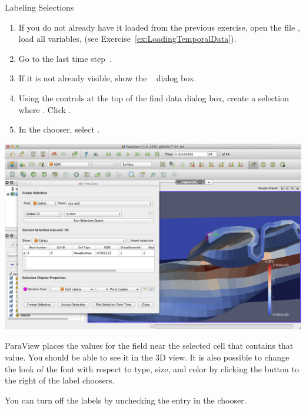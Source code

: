 \begin{exercise}{Labeling Selections}
  \label{ex:LabelingSelections}%
  \begin{enumerate}
  \item If you do not already have it loaded from the previous exercise,
    open the file , load all variables, \apply (see
    Exercise~\ref{ex:LoadingTemporalData}).
  \item Go to the last time step~\vcrLast.
  \item If it is not already visible, show the ~\findData
    dialog box.
  \item Using the controls at the top of the find data dialog box, create a
    selection where  . Click .
  \item In the  chooser, select .
  \end{enumerate}

  \begin{inlinefig}
    \includegraphics[width=\scw]{images/SelectionLabels}
  \end{inlinefig}

  ParaView places the values for the  field near the selected
  cell that contains that value. You should be able to see it in the 3D
  view. It is also possible to change the look of the font with respect to
  type, size, and color by clicking the  button to the
  right of the label choosers.

  You can turn off the labels by unchecking the entry in the  chooser.
\end{exercise}



